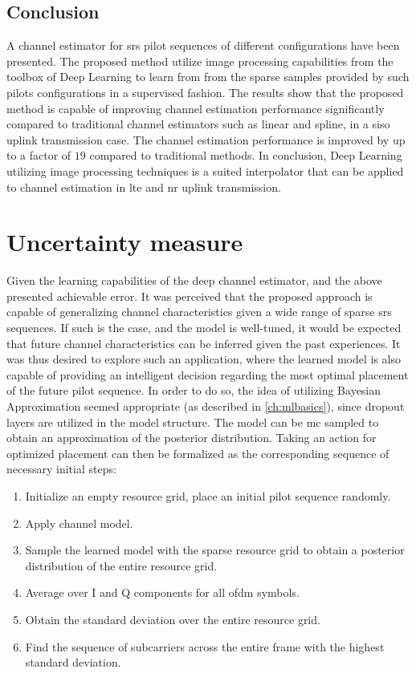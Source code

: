 \subsection{Conclusion}
A channel estimator for \gls{srs} pilot sequences of different configurations have been presented. The proposed method utilize image processing capabilities from the toolbox of Deep Learning to learn from from the sparse samples provided by such pilots configurations in a supervised fashion. The results show that the proposed method is capable of improving channel estimation performance significantly compared to traditional channel estimators such as linear and spline, in a \gls{siso} uplink transmission case. The channel estimation performance is improved by up to a factor of $19$ compared to traditional methods. In conclusion, Deep Learning utilizing image processing techniques is a suited interpolator that can be applied to channel estimation in \gls{lte} and \gls{nr} uplink transmission.

\section{Uncertainty measure}
Given the learning capabilities of the deep channel estimator, and the above presented achievable error. It was perceived that the proposed approach is capable of generalizing channel characteristics given a wide range of sparse \gls{srs} sequences. If such is the case, and the model is well-tuned, it would be expected that future channel characteristics can be inferred given the past experiences. It was thus desired to explore such an application, where the learned model is also capable of providing an intelligent decision regarding the most optimal placement of the future pilot sequence. In order to do so, the idea of utilizing Bayesian Approximation seemed appropriate (as described in \ref{ch:mlbasics}), since dropout layers are utilized in the model structure. The model can be \gls{mc} sampled to obtain an approximation of the posterior distribution. Taking an action for optimized placement can then be formalized as the corresponding sequence of necessary initial steps:

\begin{enumerate}
    \item Initialize an empty resource grid, place an initial pilot sequence randomly.
    \item Apply channel model.
    \item Sample the learned model with the sparse resource grid to obtain a posterior distribution of the entire resource grid.
    \item Average over I and Q components for all \gls{ofdm} symbols.
    \item Obtain the standard deviation over the entire resource grid.
    \item Find the sequence of subcarriers across the entire frame with the highest standard deviation.
\end{enumerate}

